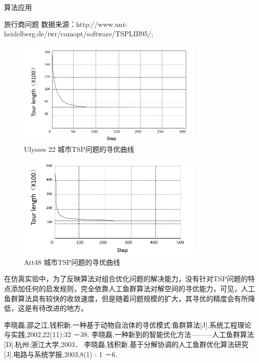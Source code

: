 \documentclass[a4paper, 11pt]{article}
\begin{document}
\begin{section}{算法应用}
\begin{subsection}{旅行商问题}
	数据来源：http://www.uni-heidelberg.de/iwr/comopt/software/TSPLIB95/;
	\begin{figure}[htbp]
		\centering
		\includegraphics[width=0.8\textwidth]{../../pic/fish4.png}
		\caption{Ulysses 22 城市TSP问题的寻优曲线}
	\end{figure}
	\begin{figure}[htbp]
		\centering
		\includegraphics[width=0.8\textwidth]{../../pic/fish5.png}
		\caption{Att48 城市TSP问题的寻优曲线}
	\end{figure}
在仿真实验中，为了反映算法对组合优化问题的解决能力，没有针对TSP问题的特点添加任何的启发规则，完全依靠人工鱼群算法对解空间的寻优能力，可见，人工鱼群算法具有较快的收敛速度，但是随着问题规模的扩大，其寻优的精度会有所降低，这是有待改进的地方。
\end{subsection}


	\begin{thebibliography}{123} 
	 李晓磊,邵之江,钱积新.一种基于动物自治体的寻优模式:鱼群算法[J].系统工程理论与实践,2002,22(11):32 －38.
	 李晓磊.一种新到的智能优化方法———人工鱼群算法[D].杭州:浙江大学,2003．
	李晓磊,钱积新.基于分解协调的人工鱼群优化算法研究[J].电路与系统学报,2003,8(1) : 1 －6.
	\end{thebibliography}

\end{section}
\end{document}

